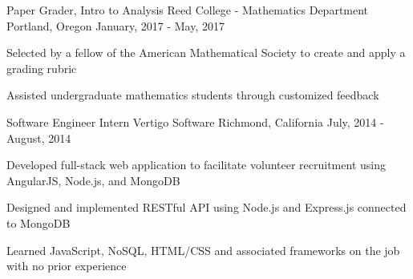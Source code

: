 \begin{cventries}
 \cventry
    {Paper Grader, Intro to Analysis} %
    {Reed College - Mathematics Department} %
    {Portland, Oregon} %
    {January, 2017 - May, 2017} %
    {
      \begin{cvitems} %
        \item {Selected by a fellow of the American Mathematical Society to
          create and apply a grading rubric}
        \item {Assisted undergraduate
          mathematics students through customized feedback}
      \end{cvitems}
    }

  \cventry
    {Software Engineer Intern} %
    {Vertigo Software} %
    {Richmond, California} %
    {July, 2014 - August, 2014} %
    {
      \begin{cvitems} %
        \item {Developed full-stack web application to facilitate volunteer recruitment using AngularJS, Node.js, and MongoDB}
        \item {Designed and implemented RESTful API using Node.js and
          Express.js connected to MongoDB}
        \item {Learned JavaScript, NoSQL, HTML/CSS and associated frameworks on the job with no prior experience}
      \end{cvitems}
    }


\end{cventries}
